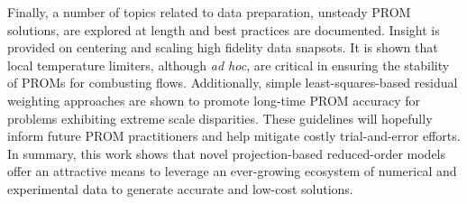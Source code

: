 Finally, a number of topics related to data preparation, unsteady PROM solutions,  are explored at length and best practices are documented. Insight is provided on  centering and scaling high fidelity data snapsots. It is shown that local temperature limiters, although \textit{ad hoc}, are critical in ensuring the stability of PROMs for combusting flows. Additionally, simple least-squares-based residual weighting approaches are shown to promote long-time PROM accuracy for problems exhibiting extreme scale disparities. These guidelines will hopefully inform future PROM practitioners and help mitigate costly trial-and-error efforts. In summary, this work shows that  novel projection-based reduced-order models offer an attractive means to leverage an ever-growing ecosystem of numerical and experimental data to generate accurate and low-cost  solutions.